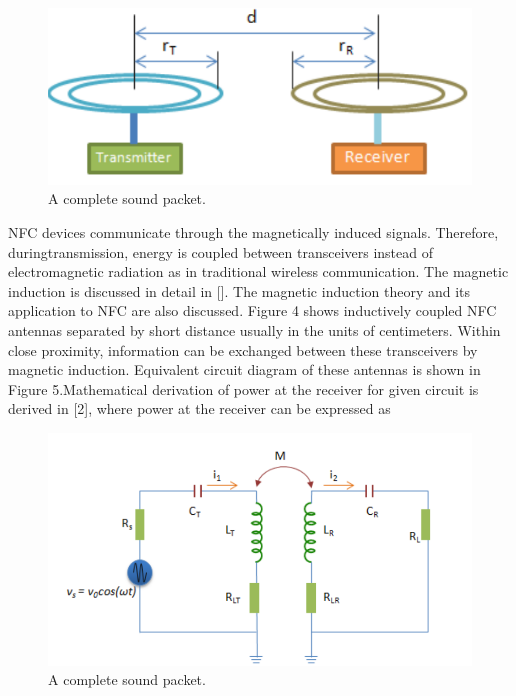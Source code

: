 \documentclass[journal]{IEEEtran}
\begin{document}
\begin{figure}[htbp]
\centerline{\includegraphics[scale=0.35]{InductivelycoupledNFCantennas.png}}
\caption{A complete sound packet.}
\label{fig}
\end{figure}

NFC devices communicate through the magnetically induced signals. Therefore, duringtransmission, energy is coupled between transceivers instead of electromagnetic radiation as in traditional wireless communication. The magnetic induction is discussed in detail in []. The magnetic induction theory and its application to NFC are also discussed. Figure 4 shows inductively coupled NFC antennas separated by short distance usually in the units of centimeters. Within close proximity, information can be exchanged between these transceivers by magnetic induction. Equivalent circuit diagram of these antennas is shown in Figure 5.Mathematical derivation of power at the receiver for given circuit is derived in [2], where power at the receiver can be expressed as

\begin{figure}[htbp]
\centerline{\includegraphics[scale=0.3]{EquivalentcircuitofinFigur1.png}}
\caption{A complete sound packet.}
\label{fig}
\end{figure}
\end{document}
